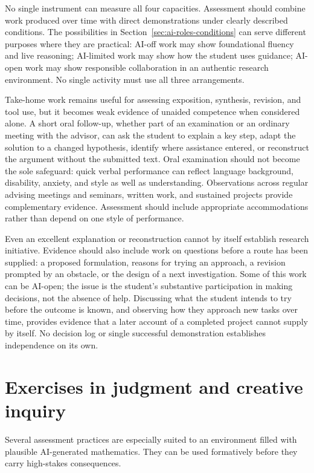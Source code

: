 \documentclass[11pt]{article}
\begin{document}
No single instrument can measure all four capacities.  Assessment should combine work
produced over time with direct demonstrations under clearly described conditions.
The possibilities in Section~\ref{sec:ai-roles-conditions} can serve different purposes
where they are practical: AI-off work may show foundational fluency and live reasoning;
AI-limited work may show how the student uses guidance; AI-open work may show responsible
collaboration in an authentic research environment. No single activity must use all
three arrangements.

Take-home work remains useful for assessing exposition, synthesis, revision, and tool use,
but it becomes weak evidence of unaided competence when considered alone.  A short oral
follow-up, whether part of an examination or an ordinary meeting with the advisor, can
ask the student to explain a key step, adapt the solution to a changed hypothesis,
identify where assistance entered, or reconstruct the argument without the submitted
text.  Oral examination should not become the sole safeguard: quick verbal
performance can reflect language background, disability, anxiety, and style as well as
understanding. Observations across regular advising meetings and seminars, written work,
and sustained projects provide complementary evidence. Assessment should include
appropriate accommodations rather than depend on one style of performance.

Even an excellent explanation or reconstruction cannot by itself establish research
initiative. Evidence should also include work on questions before a route has been
supplied: a proposed formulation, reasons for trying an approach, a revision prompted
by an obstacle, or the design of a next investigation. Some of this work can be AI-open;
the issue is the student's substantive participation in making decisions, not the
absence of help. Discussing what the student intends to try before the outcome is known,
and observing how they approach new tasks over time, provides evidence that a later
account of a completed project cannot supply by itself. No decision log or single
successful demonstration establishes independence on its own.

\section{Exercises in judgment and creative inquiry}

Several assessment practices are especially suited to an environment filled with
plausible AI-generated mathematics.  They can be used formatively before they carry
high-stakes consequences.
\end{document}
